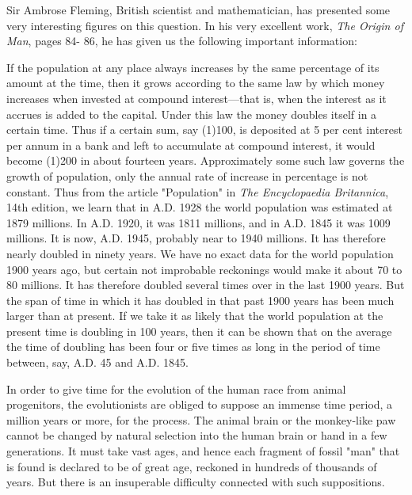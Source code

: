 Sir Ambrose Fleming, British scientist and mathematician, has presented some very
interesting figures on this question. In his very excellent work, \textit{The Origin of Man}, pages 84-
86, he has given us the following important information:

If the population at any place always increases by the same percentage of its amount at the
time, then it grows according to the same law by which money increases when invested at
compound interest—that is, when the interest as it accrues is added to the capital. Under this
law the money doubles itself in a certain time. Thus if a certain sum, say (1)100, is deposited
at 5 per cent interest per annum in a bank and left to accumulate at compound interest, it
would become (1)200 in about fourteen years. Approximately some such law governs the
growth of population, only the annual rate of increase in percentage is not constant. Thus
from the article "Population" in \textit{The Encyclopaedia Britannica}, 14th edition, we learn that in
A.D. 1928 the world population was estimated at 1879 millions. In A.D. 1920, it was 1811
millions, and in A.D. 1845 it was 1009 millions. It is now, A.D. 1945, probably near to 1940
millions. It has therefore nearly doubled in ninety years. We have no exact data for the world
population 1900 years ago, but certain not improbable reckonings would make it about 70 to
80 millions. It has therefore doubled several times over in the last 1900 years. But the span of
time in which it has doubled in that past 1900 years has been much larger than at present. If
we take it as likely that the world population at the present time is doubling in 100 years,
then it can be shown that on the average the time of doubling has been four or five times as
long in the period of time between, say, A.D. 45 and A.D. 1845.

In order to give time for the evolution of the human race from animal progenitors, the
evolutionists are obliged to suppose an immense time period, a million years or more, for the
process. The animal brain or the monkey-like paw cannot be changed by natural selection
into the human brain or hand in a few generations. It must take vast ages, and hence each
fragment of fossil "man" that is found is declared to be of great age, reckoned in hundreds of
thousands of years. But there is an insuperable difficulty connected with such suppositions.


